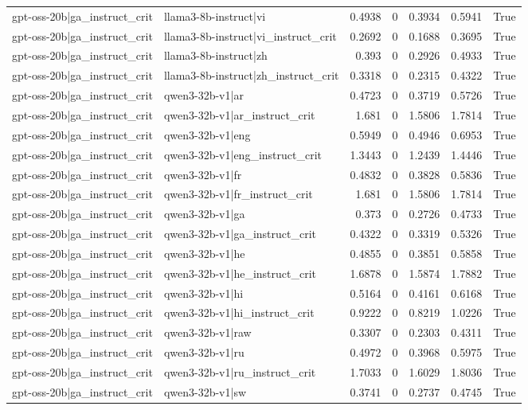 \begin{table}
\begin{tabular}{l l r r r r l}
gpt-oss-20b|ga_instruct_crit & llama3-8b-instruct|vi & 0.4938 & 0 & 0.3934 & 0.5941 & True \\
gpt-oss-20b|ga_instruct_crit & llama3-8b-instruct|vi_instruct_crit & 0.2692 & 0 & 0.1688 & 0.3695 & True \\
gpt-oss-20b|ga_instruct_crit & llama3-8b-instruct|zh & 0.393 & 0 & 0.2926 & 0.4933 & True \\
gpt-oss-20b|ga_instruct_crit & llama3-8b-instruct|zh_instruct_crit & 0.3318 & 0 & 0.2315 & 0.4322 & True \\
gpt-oss-20b|ga_instruct_crit & qwen3-32b-v1|ar & 0.4723 & 0 & 0.3719 & 0.5726 & True \\
gpt-oss-20b|ga_instruct_crit & qwen3-32b-v1|ar_instruct_crit & 1.681 & 0 & 1.5806 & 1.7814 & True \\
gpt-oss-20b|ga_instruct_crit & qwen3-32b-v1|eng & 0.5949 & 0 & 0.4946 & 0.6953 & True \\
gpt-oss-20b|ga_instruct_crit & qwen3-32b-v1|eng_instruct_crit & 1.3443 & 0 & 1.2439 & 1.4446 & True \\
gpt-oss-20b|ga_instruct_crit & qwen3-32b-v1|fr & 0.4832 & 0 & 0.3828 & 0.5836 & True \\
gpt-oss-20b|ga_instruct_crit & qwen3-32b-v1|fr_instruct_crit & 1.681 & 0 & 1.5806 & 1.7814 & True \\
gpt-oss-20b|ga_instruct_crit & qwen3-32b-v1|ga & 0.373 & 0 & 0.2726 & 0.4733 & True \\
gpt-oss-20b|ga_instruct_crit & qwen3-32b-v1|ga_instruct_crit & 0.4322 & 0 & 0.3319 & 0.5326 & True \\
gpt-oss-20b|ga_instruct_crit & qwen3-32b-v1|he & 0.4855 & 0 & 0.3851 & 0.5858 & True \\
gpt-oss-20b|ga_instruct_crit & qwen3-32b-v1|he_instruct_crit & 1.6878 & 0 & 1.5874 & 1.7882 & True \\
gpt-oss-20b|ga_instruct_crit & qwen3-32b-v1|hi & 0.5164 & 0 & 0.4161 & 0.6168 & True \\
gpt-oss-20b|ga_instruct_crit & qwen3-32b-v1|hi_instruct_crit & 0.9222 & 0 & 0.8219 & 1.0226 & True \\
gpt-oss-20b|ga_instruct_crit & qwen3-32b-v1|raw & 0.3307 & 0 & 0.2303 & 0.4311 & True \\
gpt-oss-20b|ga_instruct_crit & qwen3-32b-v1|ru & 0.4972 & 0 & 0.3968 & 0.5975 & True \\
gpt-oss-20b|ga_instruct_crit & qwen3-32b-v1|ru_instruct_crit & 1.7033 & 0 & 1.6029 & 1.8036 & True \\
gpt-oss-20b|ga_instruct_crit & qwen3-32b-v1|sw & 0.3741 & 0 & 0.2737 & 0.4745 & True \\

\end{tabular}
\end{table}
